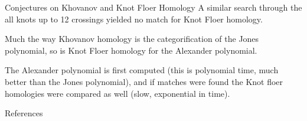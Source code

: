 \documentclass{beamer}
\begin{document}
    \begin{frame}{Conjectures on Khovanov and Knot Floer Homology}
        A similar search through the all knots up to 12 crossings yielded no
        match for Knot Floer homology.
        \par\hfill\par
        Much the way Khovanov homology is the categorification of the Jones
        polynomial, so is Knot Floer homology for the Alexander polynomial.
        \par\hfill\par
        The Alexander polynomial is first computed (this is polynomial time,
        much better than the Jones polynomial), and if matches were found the
        Knot floer homologies were compared as well (slow, exponential in time).
    \end{frame}
    \begin{frame}{References}
        \begin{itemize}
            
        \end{itemize}
    \end{frame}
\end{document}
